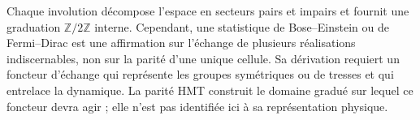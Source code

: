 Chaque involution décompose l'espace en secteurs pairs et impairs et fournit
une graduation \(\mathbb Z/2\mathbb Z\) interne. Cependant, une statistique
de Bose--Einstein ou de Fermi--Dirac est une affirmation sur l'échange de
plusieurs réalisations indiscernables, non sur la parité d'une unique cellule.
Sa dérivation requiert un foncteur d'échange qui représente les groupes
symétriques ou de tresses et qui entrelace la dynamique. La parité HMT construit
le domaine gradué sur lequel ce foncteur devra agir ; elle n'est pas identifiée
ici à sa représentation physique.
